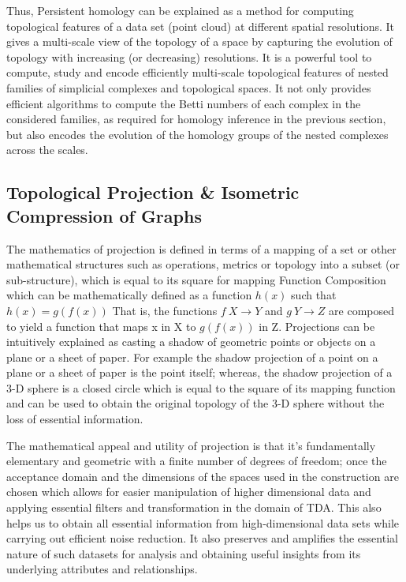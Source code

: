 Thus, Persistent homology can be explained  as a method for computing topological features of a data set (point cloud) at different spatial resolutions. It gives a multi-scale view of the topology of a space by capturing the evolution of topology with increasing (or decreasing) resolutions. It  is a powerful tool to compute, study and encode efficiently multi-scale topological features of nested families of simplicial complexes and topological spaces. It not only provides efficient algorithms to compute the Betti numbers of each complex in the considered families, as required for homology inference in the previous section, but also encodes the evolution of the homology groups of the nested complexes across the scales.\cite{03.2_2008FindingHomology}\cite{03.3_de2007PersistentHomology}\cite{09.2_chazal2008CompGeometry} \cite{11.0_chazal2017TopoDataScience}

\subsection{Topological Projection \& Isometric Compression of Graphs}

The mathematics of projection\cite{12.1_2002topologicalInvariaceProjection} is defined in terms of a mapping of a set or other mathematical structures such as operations, metrics or topology into a subset (or sub-structure), which is equal to its square for mapping Function  Composition  which can be mathematically defined as a function $h(x)$ such that $h(x) = g(f(x))$ That is, the functions $f \: X \rightarrow Y$ and $g \: Y \rightarrow Z$ are composed to yield a function that maps x in X to $g(f(x))$ in Z.\cite{12.2_ProjectionMath}  Projections can be intuitively explained as casting a shadow of  geometric points or objects  on a plane or a sheet of paper. For example the shadow projection of a point on a plane or a sheet of paper is the point itself; whereas, the shadow projection of a 3-D sphere is a closed circle which is equal to the square of its mapping function and can be used to obtain the original topology of the 3-D sphere without the loss of essential information.\cite{12.0_alatorre2018TDAinvariant}

The mathematical appeal and utility of projection is that it's fundamentally elementary and geometric with a finite number of degrees of freedom; once the acceptance domain and the dimensions of the spaces used in the construction are chosen which allows for easier manipulation of higher dimensional data and applying essential filters and transformation in the domain of TDA. This also helps us to obtain all essential information from high-dimensional data sets while carrying out efficient noise reduction. It also preserves and amplifies the essential nature of such datasets for analysis and obtaining useful insights from its underlying attributes and relationships.\cite{01.0_2010introductionTopoPropertiesInvariance}\cite{02.3_2017introductionTDA} \cite{02.4_TDAResearch}

